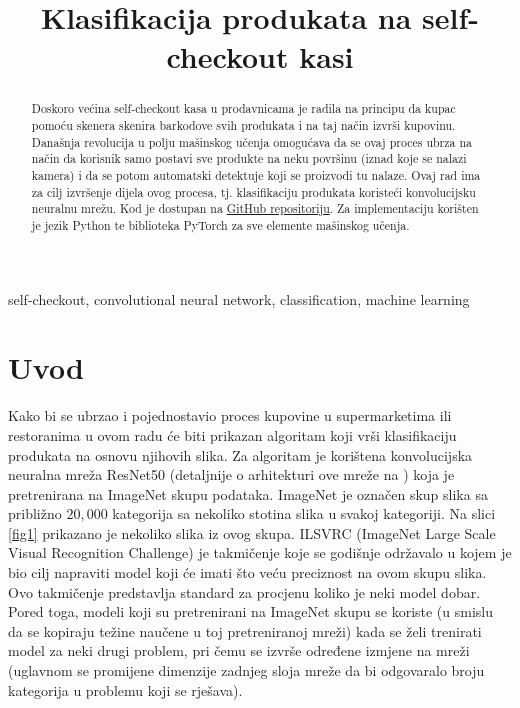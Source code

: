 \documentclass[conference]{IEEEtran}
\begin{document}
\title{Klasifikacija produkata na self-checkout kasi\\}

\author{
}

\maketitle

\begin{abstract}
Doskoro većina self-checkout kasa u prodavnicama je radila na principu da kupac pomoću skenera skenira barkodove svih produkata i na taj način izvrši kupovinu. Današnja revolucija u polju mašinskog učenja omogućava da se ovaj proces ubrza na način da korisnik samo postavi sve produkte na neku površinu (iznad koje se nalazi kamera) i da se potom automatski detektuje koji se proizvodi tu nalaze. Ovaj rad ima za cilj izvršenje dijela ovog procesa, tj. klasifikaciju produkata koristeći konvolucijsku neuralnu mrežu. Kod je dostupan na \href{https://github.com/adisabolic/product_classification}{GitHub repositoriju}. Za implementaciju korišten je jezik Python te biblioteka PyTorch za sve elemente mašinskog učenja.
\end{abstract}

\begin{IEEEkeywords}
self-checkout, convolutional neural network, classification, machine learning
\end{IEEEkeywords}

\section{Uvod}
Kako bi se ubrzao i pojednostavio proces kupovine u supermarketima ili restoranima u ovom radu će biti prikazan algoritam koji vrši klasifikaciju produkata na osnovu njihovih slika. Za algoritam je korištena konvolucijska neuralna mreža ResNet50 (detaljnije o arhitekturi ove mreže na \cite{b1}) koja je pretrenirana na ImageNet skupu podataka. ImageNet \cite{b2} je označen skup slika sa približno $20,000$ kategorija sa nekoliko stotina slika u svakoj kategoriji. Na slici \ref{fig1} prikazano je nekoliko slika iz ovog skupa. ILSVRC \cite{b3} (ImageNet Large Scale Visual Recognition Challenge) je takmičenje koje se godišnje održavalo u kojem je bio cilj napraviti model koji će imati što veću preciznost na ovom skupu slika. Ovo takmičenje predstavlja standard za procjenu koliko je neki model dobar. Pored toga, modeli koji su pretrenirani na ImageNet skupu se koriste (u smislu da se kopiraju težine naučene u toj pretreniranoj mreži) kada se želi trenirati model za neki drugi problem, pri čemu se izvrše određene izmjene na mreži (uglavnom se promijene dimenzije zadnjeg sloja mreže da bi odgovaralo broju kategorija u problemu koji se rješava).
\end{document}
